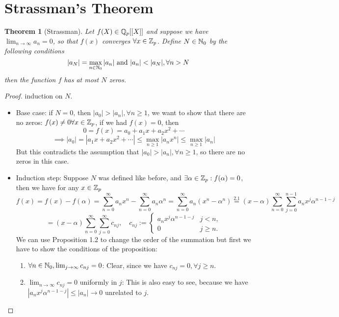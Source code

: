\documentclass[a4paper]{article}
\theoremstyle{plain}
\newtheorem{thm}{Theorem}[section]
\theoremstyle{definition}
\begin{document}
\section{Strassman's Theorem}
\begin{thm}[Strassman]
  Let $f(X) \in \Bbb Q_{p}[[X]]$ and suppose we have $\lim_{n \to \infty}a_{n} = 0$, so that $f(x)$ converges $\forall x \in \Bbb Z_{p}$. Define $N \in \Bbb N_{0}$ by the following conditions
  $$|a_{N}| = \max_{n \in \Bbb N_{0}}|a_{n}| \text{ and }|a_{n}| < |a_{N}|, \forall n > N$$
then the function $f$ has at most $N$ zeros.
\end{thm}
\begin{proof}
  induction on $N$.
  \begin{itemize}
    \item Base case: if $N = 0$, then $|a_{0}| > |a_{n}|, \forall n \geq 1$, we want to show that there are no zeros: $f(x) \neq 0 \forall x \in \Bbb Z_{p}$, if we had $f(x) = 0$, then
          $$0 = f(x) = a_{0} + a_{1}x + a_{2}x^{2} + \cdots$$
          $$ \implies |a_{0}| = |a_{1}x + a_{2}x^{2} + \cdots| \leq \max_{n \geq 1}|a_{n}x^{n}| \leq \max_{n \geq 1}|a_{n}|$$
          But this contradicts the assumption that $|a_{0}| > |a_{n}|, \forall n \geq 1$, so there are no zeros in this case.
    \item Induction step:
          Suppose $N$ was defined like before, and $\exists \alpha \in \Bbb Z_{p} : f(\alpha) = 0$, then we have for any $x \in \Bbb Z_{p}$
          $$f(x) = f(x) - f(\alpha) = \sum_{n=0}^{\infty}a_{n}x^{n} - \sum_{n=0}^{\infty}a_{n}\alpha^{n} = \sum_{n=0}^{\infty}a_{n}(x^{n} - \alpha^{n}) \overset{2.1}= (x-\alpha)\sum_{n=0}^{\infty}\sum_{j = 0}^{n-1} a_{n}x^{j}\alpha^{n-1-j}$$
          $$ = (x-\alpha) \sum_{n=0}^{\infty} \sum_{j=0}^{\infty} c_{nj}, \quad c_{nj}:= \begin{cases}a_{n}x^{j}\alpha^{n-1-j} & j < n, \\ 0 & j \geq n.\end{cases}$$
          We can use Proposition 1.2 to change the order of the summation but first we have to show the conditions of the proposition:
          \begin{enumerate}
            \item $\forall n \in \Bbb N_{0}, \lim_{j \to \infty} c_{nj} = 0$:
                  Clear, since we have $c_{nj} = 0, \forall j \geq n$.
            \item $\lim_{n \to \infty}c_{nj} = 0$ uniformly in $j$:
                  This is also easy to see, because we have $|a_{n}x^{j}\alpha^{n-1-j}| \leq |a_{n}| \to 0$ unrelated to $j$.

\end{enumerate}
\end{itemize}
\end{proof}
\end{document}
